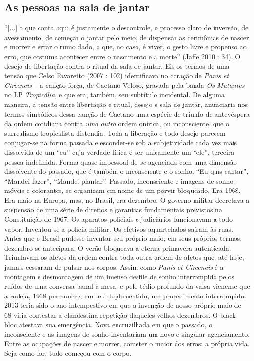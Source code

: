 \subsection{As pessoas na sala de jantar}

``{[}...{]} o que conta aqui é
justamente o descontrole, o processo claro de inversão, de avessamento,
de começar o jantar pelo meio, de dispensar as cerimônias de nascer e
morrer e errar o rumo dado, o que, no caso, é viver, o gesto livre e
propenso ao erro, que costuma acontecer entre o nascimento e a morte''
(Jaffe 2010 : 34). O desejo de libertação contra o ritual da sala de
jantar. Eis os termos de uma tensão que Celso Favaretto (2007 : 102)
identificava no coração de \emph{Panis et Circencis --} a canção-força,
de Caetano Veloso, gravada pela banda \emph{Os Mutantes }no LP
\emph{Tropicália, }e que era, também, seu subtítulo incidental. De
alguma maneira, a tensão entre libertação e ritual, desejo e sala de
jantar, anunciaria nos termos simbólicos dessa canção de Caetano uma
espécie de triunfo de antevéspera da ordem cotidiana contra \emph{uma
outra} ordem onírica, ou inconsciente, que o surrealismo tropicalista
distendia. Toda a liberação e todo desejo parecem conjugar-se na forma
passada e esconder-se sob a subjetividade cada vez mais dissolvida de um
``eu'' cuja verdade lírica é ser unicamente um ``ele'', terceira pessoa
indefinida. Forma quase-impessoal do \emph{se} agenciada com uma
dimensão dissolvente do passado, que é também o inconsciente e o sonho.
``Eu quis cantar'', ``Mandei fazer'', ``Mandei plantar''. Passado,
inconsciente e imagens de sonho, móveis e colorantes, se organizam em
nome de um porvir bloqueado. Era 1968. Era maio na Europa, mas, no
Brasil, era dezembro. O governo militar decretava a suspensão de uma
série de direitos e garantias fundamentais previstos na Constituição de
1967. Os aparatos policiais e judiciários funcionavam a todo vapor.
Inventou-se a polícia militar. Os efetivos aquartelados saíram às ruas.
Antes que o Brasil pudesse inventar seu próprio maio, em seus próprios
termos, dezembro se antecipara. O verão bloqueava a eterna primavera
autenticada. Triunfavam os afetos da ordem contra toda outra ordem de
afetos que, até hoje, jamais cessaram de pulsar nos corpos. Assim como
\emph{Panis et Circencis} é a montagem e desmontagem de um imenso
desfile de sonho interrompido pelos ruídos de uma conversa banal à mesa,
e pelo tédio profundo da valsa vienense que a rodeia, 1968 permanece, em
seu duplo sentido, um procedimento interrompido. 2013 teria sido o ano
intempestivo em que a invenção de nosso próprio maio de 68 viria
contestar a clandestina repetição daqueles velhos dezembros. O black
bloc atestava sua emergência. Nova encruzilhada em que o passado, o
inconsciente e as imagens de sonho inventariam um novo e singular
agenciamento. Entre as ocupações de nascer e morrer, cometer o maior dos
erros: a própria vida. Seja como for, tudo começou com o corpo.

